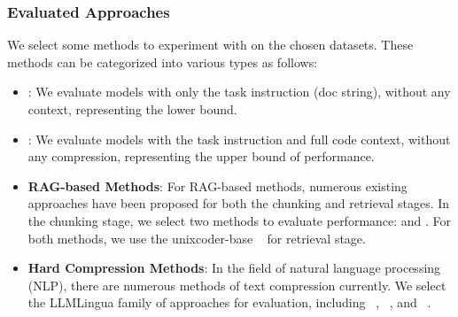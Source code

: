 \subsubsection{Evaluated Approaches}
We select some methods to experiment with on the chosen datasets. These methods can be categorized into various types as follows:
\begin{itemize}[itemsep= 1 pt,topsep = 10 pt, parsep = 1 pt, left = 5 pt]
    \item \textbf{\nocontext}: We evaluate models with only the task instruction (doc string), without any context, representing the lower bound.
    
    \item \textbf{\nocompression}: We evaluate models with the task instruction and full code context, without any compression, representing the upper bound of performance.
    \item \textbf{RAG-based Methods}: For RAG-based methods, numerous existing approaches have been proposed for both the chunking and retrieval stages. In the chunking stage, we select two methods to evaluate performance: \textbf{\rag} and \textbf{\ragfunction}. For both methods, we use the unixcoder-base ~\cite{guo2022unixcoder} for retrieval stage.

    \item \textbf{Hard Compression Methods}: In the field of natural language processing (NLP), there are numerous methods of text compression currently. We select the LLMLingua family of approaches for evaluation, including \textbf{\llmlingua}~\cite{jiang2023llmlingua}, \textbf{\longllmlingua}~\cite{jiang2023longllmlingua}, and \textbf{\llmlinguatwo}~\cite{pan2024llmlingua}.


\end{itemize}
